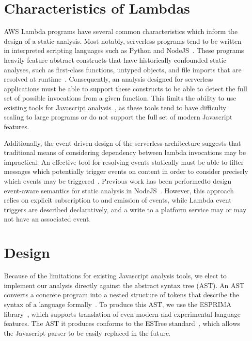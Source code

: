 \documentclass[letterpaper,twocolumn,10pt]{article}
\begin{document}
\section{Characteristics of Lambdas}
AWS Lambda programs have several common characteristics which inform the design of a static analysis. Most notably, serverless programs tend to be written in interpreted scripting languages such as Python and NodeJS~\cite{trends}. These programs heavily feature abstract constructs that have historically confounded static analyses, such as first-class functions, untyped objects, and file imports that are resolved at runtime~\cite{scriptingchallenges}. Consequently, an analysis designed for serverless applications must be able to support these constructs to be able to detect the full set of possible invocations from a given function. This limits the ability to use existing tools for Javascript analysis~\cite{WALA,jssafe,arctarus}, as these tools tend to have difficulty scaling to large programs or do not support the full set of modern Javascript features.\par

Additionally, the event-driven design of the serverless architecture suggests that traditional means of considering dependency between lambda invocations may be impractical. An effective tool for resolving events statically must be able to filter messages which potentially trigger events on content in order to consider precisely which events may be triggered~\cite{debs}. Previous work has been performedto design event-aware semantics for static analysis in NodeJS~\cite{nodejscallgraph}. However, this approach relies on explicit subscription to and emission of events, while Lambda event triggers are described declaratively, and a write to a platform service may or may not have an associated event. \par



\section{Design}

Because of the limitations for existing Javascript analysis tools, we elect to implement our analysis directly against the abstract syntax tree (AST). An AST converts a concrete program into a nested structure of tokens that describe the syntax of a language formally~\cite{ast}. To produce this AST, we use the ESPRIMA library~\cite{esprima}, which supports translation of even modern and experimental language features. The AST it produces conforms to the ESTree standard~\cite{estree}, which allows the Javascript parser to be easily replaced in the future. \par
\end{document}
